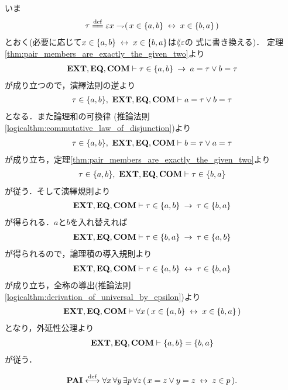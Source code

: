 	\begin{sketch}
		いま
		\begin{align}
			\tau \defeq \varepsilon x \negation (\, x \in \{a,b\} \lrarrow x \in \{b,a\}\, )
		\end{align}
		とおく(必要に応じて$x \in \{a,b\} \hspace{0.25em}\leftrightarrow\hspace{0.25em} x \in \{b,a\}$は$\lang{\varepsilon}$の
		式に書き換える)．
		定理\ref{thm:pair_members_are_exactly_the_given_two}より
		\begin{align}
			\mbox{{\bf EXT}},\mbox{{\bf EQ}},\mbox{\bf COM} \vdash
			\tau \in \{a,b\} \hspace{0.25em}\rightarrow\hspace{0.25em} a = \tau \vee b = \tau
		\end{align}
		が成り立つので，演繹法則の逆より
		\begin{align}
			\tau \in \{a,b\},\ \mbox{{\bf EXT}},\mbox{{\bf EQ}},\mbox{\bf COM} \vdash a = \tau \vee b = \tau
		\end{align}
		となる．また論理和の可換律
		(推論法則\ref{logicalthm:commutative_law_of_disjunction})より
		\begin{align}
			\tau \in \{a,b\},\ \mbox{{\bf EXT}},\mbox{{\bf EQ}},\mbox{\bf COM} \vdash b = \tau \vee a = \tau
		\end{align}
		が成り立ち，定理\ref{thm:pair_members_are_exactly_the_given_two}より
		\begin{align}
			\tau \in \{a,b\},\ \mbox{{\bf EXT}},\mbox{{\bf EQ}},\mbox{\bf COM} \vdash \tau \in \{b,a\}
		\end{align}
		が従う．そして演繹規則より
		\begin{align}
			\mbox{{\bf EXT}},\mbox{{\bf EQ}},\mbox{\bf COM} \vdash \tau \in \{a,b\} \hspace{0.25em}\rightarrow\hspace{0.25em} \tau \in \{b,a\}
		\end{align}
		が得られる．$a$と$b$を入れ替えれば
		\begin{align}
			\mbox{{\bf EXT}},\mbox{{\bf EQ}},\mbox{\bf COM} \vdash \tau \in \{b,a\} \hspace{0.25em}\rightarrow\hspace{0.25em} \tau \in \{a,b\}
		\end{align}
		が得られるので，論理積の導入規則より
		\begin{align}
			\mbox{{\bf EXT}},\mbox{{\bf EQ}},\mbox{\bf COM} \vdash \tau \in \{a,b\} \hspace{0.25em}\leftrightarrow\hspace{0.25em} \tau \in \{b,a\}
		\end{align}
		が成り立ち，全称の導出(推論法則\ref{logicalthm:derivation_of_universal_by_epsilon})より
		\begin{align}
			\mbox{{\bf EXT}},\mbox{{\bf EQ}},\mbox{\bf COM} \vdash \forall x\, (\, x \in \{a,b\} \hspace{0.25em}\leftrightarrow\hspace{0.25em} x \in \{b,a\}\, )
		\end{align}
		となり，外延性公理より
		\begin{align}
			\mbox{{\bf EXT}},\mbox{{\bf EQ}},\mbox{\bf COM} \vdash \{a,b\} = \{b,a\}
		\end{align}
		が従う．
		\QED
	\end{sketch}
		
	\begin{screen}
		\begin{axm}[対の公理]
			\begin{align}
				\mbox{{\bf PAI}} \overset{\mathrm{def}}{\longleftrightarrow} \forall x\, \forall y\, \exists p\, \forall z\, 
				(\, x = z \vee y = z \hspace{0.25em}\leftrightarrow\hspace{0.25em} z \in p\, ).
			\end{align}
		\end{axm}
	\end{screen}
	
